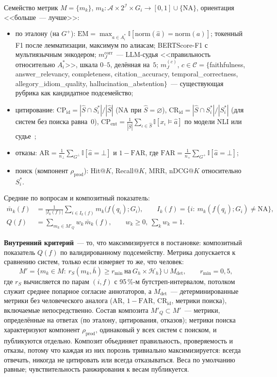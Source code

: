 \documentclass{article}
\newcommand{\I}{\mathbb{I}}                         %
\newcommand{\Hh}{\mathcal{H}_{h}}
\newcommand{\rprod}{\rho_{\mathrm{prod}}}
\newcommand{\refuse}{\bot}                          %
\newcommand{\NA}{\mathrm{NA}}
\newcommand{\norm}{\mathrm{norm}}
\newcommand{\EM}{\mathrm{EM}}
\newcommand{\CP}{\mathrm{CP}}
\newcommand{\CR}{\mathrm{CR}}
\newcommand{\AR}{\mathrm{AR}}
\newcommand{\FAR}{\mathrm{FAR}}
\newcommand{\mcorr}{m_J^{\mathrm{corr}}}
\newcommand{\rS}{r_{S}}
\newcommand{\rmin}{r_{\min}}
\newcommand{\Mdet}{M_{\mathrm{det}}}
\newcommand{\MQ}{M'_{Q}}
\newcommand{\Kd}{K}
\begin{document}
Семейство метрик $M=\{m_k\}$, $m_k:\mathcal{A}\times2^{\mathcal{I}}\times G_i\to[0,1]\cup\{\NA\}$, ориентация <<больше~--- лучше>>:
\begin{itemize}
  \item по эталону (на $G^+$): $\EM=\max_{a\in A^*_i}\I[\norm(\hat a)=\norm(a)]$; токенный F1 после лемматизации, максимум по алиасам; BERTScore-F1 с мультиязычным энкодером; $\mcorr$~--- LLM-судья <<правильность относительно $A^*_i$>>, шкала $0$--$5$, делённая на~$5$; $m_J^{(c)}$, $c\in\mathcal{C}=\{$faithfulness, answer\_relevancy, completeness, citation\_accuracy, temporal\_correctness, allegory\_idiom\_quality, hallucination\_abstention$\}$~--- существующая рубрика как кандидатное подсемейство;
  \item цитирование: $\CP_{\mathrm{id}}=|\hat S\cap S^*_i|/|\hat S|$ ($\NA$ при $\hat S=\varnothing$), $\CR_{\mathrm{id}}=|\hat S\cap S^*_i|/|S^*_i|$ (для систем без поиска равна~$0$), $\CP_{\mathrm{ent}}=\frac{1}{|\hat S|}\sum_{\iota\in\hat S}\I[x_\iota\models\hat a]$ по модели NLI или судье~\cite{gao2023alce};
  \item отказы: $\AR=\frac{1}{n_{\refuse}}\sum_{G^{\refuse}}\I[\hat a=\refuse]$ и $1-\FAR$, где $\FAR=\frac{1}{n_+}\sum_{G^+}\I[\hat a=\refuse]$;
  \item поиск (компонент $\rprod$): Hit@$\Kd$, Recall@$\Kd$, MRR, nDCG@$\Kd$ относительно $S^*_i$.
\end{itemize}
Средние по вопросам и композитный показатель:
\begin{align}
  \bar m_k(f)&=\frac{1}{|I_k(f)|}\sum_{i\in I_k(f)} m_k\bigl(f(q_i);G_i\bigr),\qquad I_k(f)=\{i:\ m_k(f(q_i);G_i)\ne\NA\},\label{eq:mbar}\\
  Q(f)&=\sum_{m_k\in\MQ} w_k\,\bar m_k(f),\qquad w_k\ge0,\ \sum_k w_k=1.\label{eq:Q}
\end{align}

\textbf{Внутренний критерий}~--- то, что максимизируется в постановке: композитный показатель $Q(f)$ по валидированному подсемейству. Метрика допускается к сравнению систем, только если измеряет то же, что человек:
\begin{equation}\label{eq:Mprime}
  M'=\bigl\{m_k\in M:\ \rS(m_k,\bar h)\ge\rmin\ \text{на}\ G_h\times\Hh\bigr\}\cup\Mdet,\qquad\rmin=0{,}5,
\end{equation}
где $\rS$ вычисляется по парам $(i,f)$ с 95\,\%-м бутстреп-интервалом, потолком служит среднее попарное согласие аннотаторов, а $\Mdet$~--- детерминированные метрики без человеческого аналога ($\AR$, $1-\FAR$, $\CR_{\mathrm{id}}$, метрики поиска), включаемые непосредственно. Состав композита $\MQ\subset M'$~--- метрики, определённые на ответах (по эталону, цитирования, отказов); метрики поиска характеризуют компонент $\rprod$, одинаковый у всех систем с поиском, и публикуются отдельно. Композит объединяет правильность, проверяемость и отказы, потому что каждая из них порознь тривиально максимизируется: всегда отвечать, никогда не цитировать или всегда отказываться. Веса по умолчанию равные; чувствительность ранжирования к весам публикуется.
\end{document}
